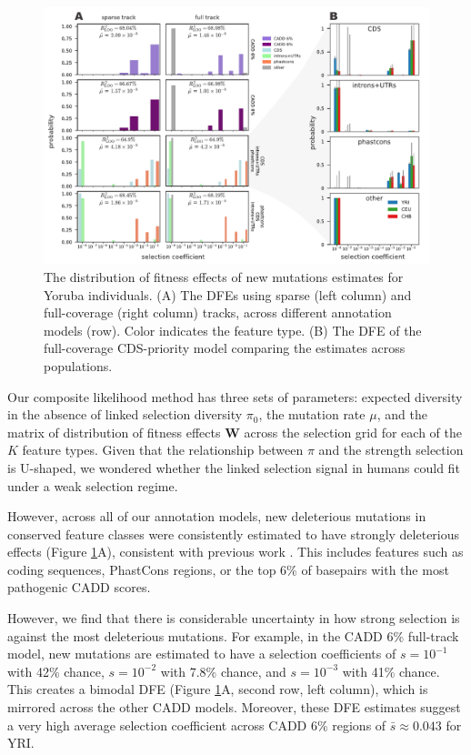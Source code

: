 \documentclass[11pt]{article}
\begin{document}
\begin{figure}[htbp] \centering
    \includegraphics[width=\textwidth]{figures/figure_4.pdf} 
    \caption{The distribution of fitness effects of new mutations estimates for
        Yoruba individuals. (A) The DFEs using sparse (left column) and
        full-coverage (right column) tracks, across different annotation models
        (row). Color indicates the feature type. (B) The DFE of the
        full-coverage CDS-priority model comparing the estimates across
    populations.}
  \label{fig:figure-3}
\end{figure}

Our composite likelihood method has three sets of parameters: expected
diversity in the absence of linked selection diversity $\pi_0$, the mutation
rate $\mu$, and the matrix of distribution of fitness effects $\mathbf{W}$
across the selection grid for each of the $K$ feature types. Given that the
relationship between $\pi$ and the strength selection is U-shaped, we wondered
whether the linked selection signal in humans could fit under a weak selection
regime.

However, across all of our annotation models, new deleterious mutations in
conserved feature classes were consistently estimated to have strongly
deleterious effects (Figure \ref{fig:figure-3}A), consistent with previous work
\parencite{McVicker2009-ax,Murphy2022-sj}. This includes features such as
coding sequences, PhastCons regions, or the top 6\% of basepairs with the most
pathogenic CADD scores. 



However, we find that there is considerable uncertainty
in how strong selection is against the most deleterious mutations. For example,
in the CADD 6\% full-track model, new mutations are estimated to have a
selection coefficients of $s = 10^{-1}$ with 42\% chance, $s=10^{-2}$ with
7.8\% chance, and $s=10^{-3}$ with 41\% chance. This creates a bimodal DFE
(Figure \ref{fig:figure-3}A, second row, left column), which is mirrored across
the other CADD models. Moreover, these DFE estimates suggest a very high
average selection coefficient across CADD 6\% regions of ${\bar{s}}
\approx 0.043$ for YRI.
\end{document}
